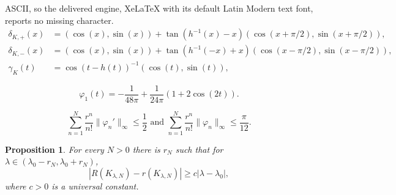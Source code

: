 \documentclass[10pt,a4paper]{amsart}
\newtheorem{proposition}{Proposition}
\begin{document}
ASCII, so the delivered engine, XeLaTeX with its default Latin Modern text font, reports no missing character.
	\begin{align}
        \label{eq_parametrization_h_plus} \delta_{K,+}(x) &= (\cos(x), \sin(x)) +\tan\left(h^{-1}(x) - x\right) (\cos(x+\pi/2), \sin(x+\pi/2)),\\
	\label{eq_parametrization_h_minus} \delta_{K,-}(x) &= (\cos(x), \sin(x)) +\tan\left(h^{-1}(-x) + x\right) (\cos(x-\pi/2), \sin(x-\pi/2)),\\
	\label{eq_parametrization_gamma} \gamma_K(t) &= \cos(t-h(t))^{-1} (\cos(t), \sin(t)),
	\end{align}

\begin{equation}
	\label{eq_varphi1}
	\varphi_1(t) = -\frac 1{48 \pi} + \frac 1{24 \pi} (1+2\cos(2t)).
\end{equation}

\begin{equation}
	\label{eq_series_bound}
	\sum_{n=1}^N \frac{r^n}{n!} \|\varphi_n'\|_\infty \leq \frac 12 \text{ and } \sum_{n=1}^N \frac{r^n}{n!} \|\varphi_n\|_\infty \leq \frac \pi {12}.
\end{equation}

\begin{proposition}
	\label{prop_bound_Rr}
	For every $N>0$ there is $r_N$ such that for $\lambda \in (\lambda_0-r_N, \lambda_0+r_N)$,
	\[ |R(K_{\lambda,N}) - r(K_{\lambda,N})| \geq c |\lambda - \lambda_0|, \]
	where $c>0$ is a universal constant.
\end{proposition}
\end{document}

